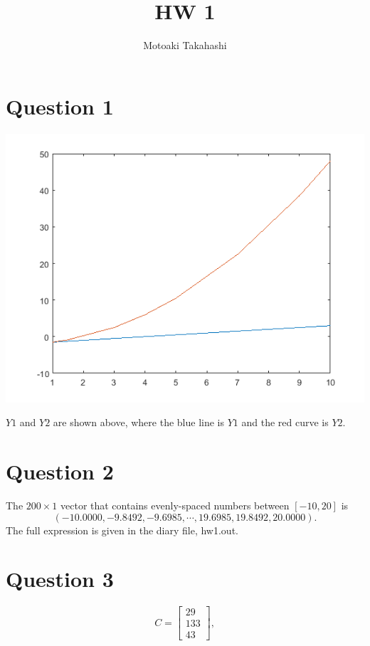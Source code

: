 \documentclass[12pt]{article}
\begin{document}
 
 
\title{HW 1}
\author{Motoaki Takahashi}
\maketitle
\section{Question 1}

\includegraphics{q1.png}\par
$Y1$ and $Y2$ are shown above, where the blue line is $Y1$ and the red curve is $Y2$.

\section{Question 2}
The $200\times1$ vector that contains evenly-spaced numbers between $[-10, 20]$ is 
$$
( -10.0000, -9.8492, -9.6985, \cdots, 19.6985, 19.8492, 20.0000).
$$
The full expression is given in the diary file, hw1.out.

\section{Question 3}
$$
C=\left[
\begin{array}{c}
    29\\
   133\\
43
\end{array}
\right],
$$
\end{document}
